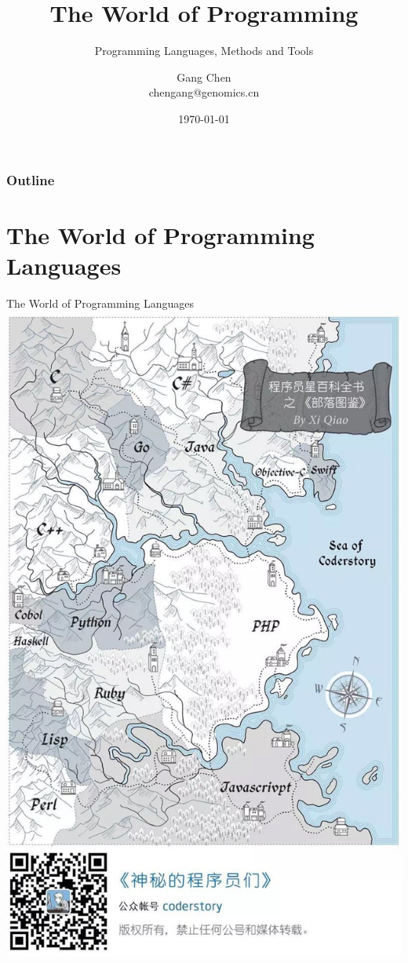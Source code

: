\documentclass[UTF8]{beamer}
\title{The World of Programming}
\subtitle{Programming Languages, Methods and Tools}
\author{Gang Chen\\ chengang@genomics.cn}
\date{\today}
\begin{document}
\begin{frame}
\titlepage
\end{frame}

\begin{frame}[t]\frametitle{Outline}
\tableofcontents[hideallsubsections]
\end{frame}


\section{The World of Programming Languages}

\begin{frame}[t]{The World of Programming Languages}
    \includegraphics{langworld.jpg}
\end{frame}
\end{document}
